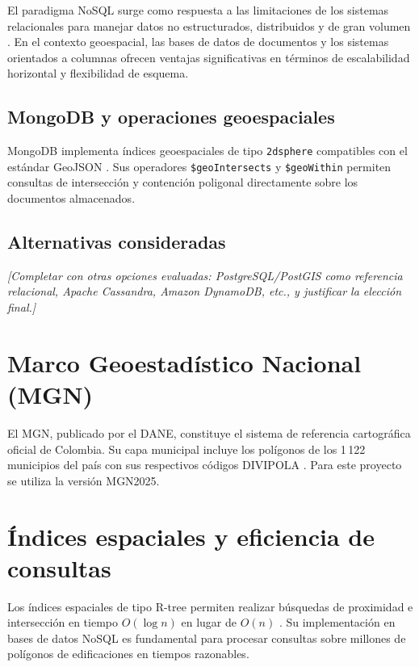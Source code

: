 \documentclass[12pt, a4paper]{report}
\begin{document}
El paradigma NoSQL surge como respuesta a las limitaciones de los sistemas
relacionales para manejar datos no estructurados, distribuidos y de gran
volumen \parencite{han2011survey}. En el contexto geoespacial, las bases de
datos de documentos y los sistemas orientados a columnas ofrecen ventajas
significativas en términos de escalabilidad horizontal y flexibilidad de
esquema.

\subsection{MongoDB y operaciones geoespaciales}

MongoDB implementa índices geoespaciales de tipo \texttt{2dsphere} compatibles
con el estándar GeoJSON \parencite{mongodb2023geo}. Sus operadores
\texttt{\$geoIntersects} y \texttt{\$geoWithin} permiten consultas de
intersección y contención poligonal directamente sobre los documentos
almacenados.

\subsection{Alternativas consideradas}

\textit{[Completar con otras opciones evaluadas: PostgreSQL/PostGIS como
referencia relacional, Apache Cassandra, Amazon DynamoDB, etc., y justificar
la elección final.]}

\section{Marco Geoestadístico Nacional (MGN)}

El MGN, publicado por el DANE, constituye el sistema de referencia cartográfica
oficial de Colombia. Su capa municipal incluye los polígonos de los
1\,122 municipios del país con sus respectivos códigos DIVIPOLA
\parencite{dane2025mgn}. Para este proyecto se utiliza la versión MGN2025.

\section{Índices espaciales y eficiencia de consultas}

Los índices espaciales de tipo R-tree permiten realizar búsquedas de
proximidad e intersección en tiempo $O(\log n)$ en lugar de $O(n)$
\parencite{guttman1984rtree}. Su implementación en bases de datos NoSQL
es fundamental para procesar consultas sobre millones de polígonos de
edificaciones en tiempos razonables.
\end{document}
